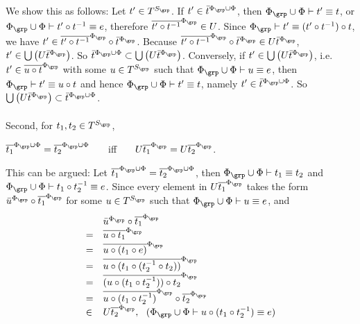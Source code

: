 \begin{enumerate}[1.]
We show this as follows: Let $t^\prime \in T^{S_\grp}$. If $t^\prime \in \bar{t}^{\Phi_\grp \cup \Phi}$, then $\Phi_\grp \cup \Phi \vdash t^\prime \equiv t$, or $\Phi_\grp \cup \Phi \vdash t^\prime \circ t^{-1} \equiv e$, therefore $\overline{t^\prime \circ t^{-1}}^{\Phi_\grp} \in U$. Since $\Phi_\grp \vdash t^\prime \equiv (t^\prime \circ t^{-1}) \circ t$, we have $t^\prime \in \overline{t^\prime \circ t^{-1}}^{\Phi_\grp} \circ \bar{t}^{\Phi_\grp}$. Because $\overline{t^\prime \circ t^{-1}}^{\Phi_\grp} \circ \bar{t}^{\Phi_\grp} \in U\bar{t}^{\Phi_\grp}$, $t^\prime \in \bigcup \left( U\bar{t}^{\Phi_\grp} \right)$. So $\bar{t}^{\Phi_\grp \cup \Phi} \subset \bigcup \left( U \bar{t}^{\Phi_\grp} \right)$. Conversely, if $t^\prime \in \bigcup \left( U\bar{t}^{\Phi_\grp} \right)$, i.e. $t^\prime \in \overline{u \circ t}^{\Phi_\grp}$ with some $u \in T^{S_\grp}$ such that $\Phi_\grp \cup \Phi \vdash u \equiv e$, then $\Phi_\grp \vdash t^\prime \equiv u \circ t$ and hence $\Phi_\grp \cup \Phi \vdash t^\prime \equiv t$, namely $t^\prime \in \bar{t}^{\Phi_\grp \cup \Phi}$. So $\bigcup \left( U \bar{t}^{\Phi_\grp} \right) \subset \bar{t}^{\Phi_\grp \cup \Phi}$.\\
\ \\
Second, for $t_1, t_2 \in T^{S_\grp}$,
\begin{center}
$\overline{t_1}^{\Phi_\grp \cup \Phi} = \overline{t_2}^{\Phi_\grp \cup \Phi}$ \ \ \ iff \ \ \ $U\overline{t_1}^{\Phi_\grp} = U\overline{t_2}^{\Phi_\grp}$.
\end{center}
This can be argued: Let $\overline{t_1}^{\Phi_\grp \cup \Phi} = \overline{t_2}^{\Phi_\grp \cup \Phi}$, then $\Phi_\grp \cup \Phi \vdash t_1 \equiv t_2$ and $\Phi_\grp \cup \Phi \vdash t_1 \circ t_2^{-1} \equiv e$. Since every element in $U\overline{t_1}^{\Phi_\grp}$ takes the form $\bar{u}^{\Phi_\grp} \circ \overline{t_1}^{\Phi_\grp}$ for some $u \in T^{S_\grp}$ such that $\Phi_\grp \cup \Phi \vdash u \equiv e$, and
\[
\begin{array}{ll}
\ & \bar{u}^{\Phi_\grp} \circ \overline{t_1}^{\Phi_\grp} \cr
= & \overline{u \circ t_1}^{\Phi_\grp} \cr
= & \overline{u \circ (t_1 \circ e)}^{\Phi_\grp} \cr
= & \overline{u \circ (t_1 \circ (t_2^{-1} \circ t_2))}^{\Phi_\grp} \cr
= & \overline{(u \circ (t_1 \circ t_2^{-1})) \circ t_2}^{\Phi_\grp} \cr
= & \overline{u \circ (t_1 \circ t_2^{-1})}^{\Phi_\grp} \circ \overline{t_2}^{\Phi_\grp} \cr
\in & U\overline{t_2}^{\Phi_\grp}, \mbox{\ \ ($\Phi_\grp \cup \Phi \vdash u \circ (t_1 \circ t_2^{-1}) \equiv e$)}
\end{array}
\]
\end{enumerate}
